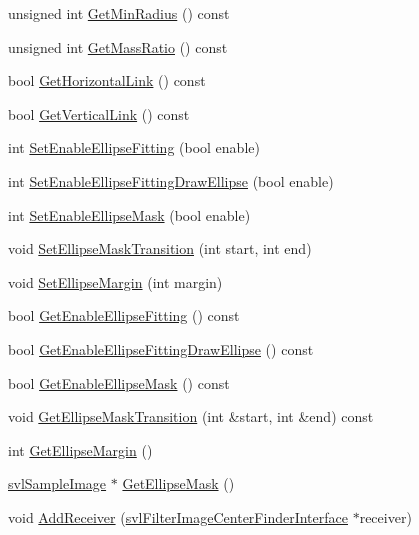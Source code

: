 \begin{DoxyCompactItemize}
\item 
unsigned int \hyperlink{classsvl_filter_image_center_finder_aee57a2627e70cf9d615f38cd833e5f8a}{Get\-Min\-Radius} () const 
\item 
unsigned int \hyperlink{classsvl_filter_image_center_finder_a0041521938da500f3e478083f447a709}{Get\-Mass\-Ratio} () const 
\item 
bool \hyperlink{classsvl_filter_image_center_finder_a0293e49d410ca18049ca7e7b09585229}{Get\-Horizontal\-Link} () const 
\item 
bool \hyperlink{classsvl_filter_image_center_finder_a395359676b6956f465dcf283d78e40ac}{Get\-Vertical\-Link} () const 
\item 
int \hyperlink{classsvl_filter_image_center_finder_a3fb0d14197e6e0e67918a075c17a0db3}{Set\-Enable\-Ellipse\-Fitting} (bool enable)
\item 
int \hyperlink{classsvl_filter_image_center_finder_a3c3ac4525b0adf2c9c9b74d80e0298a1}{Set\-Enable\-Ellipse\-Fitting\-Draw\-Ellipse} (bool enable)
\item 
int \hyperlink{classsvl_filter_image_center_finder_a3f9384ebde6adbddb079ef78519de0c5}{Set\-Enable\-Ellipse\-Mask} (bool enable)
\item 
void \hyperlink{classsvl_filter_image_center_finder_ae0183d7a26a709a6b082cd61b01794a1}{Set\-Ellipse\-Mask\-Transition} (int start, int end)
\item 
void \hyperlink{classsvl_filter_image_center_finder_a2876dab0dd034e15d830ffc5d48a44a3}{Set\-Ellipse\-Margin} (int margin)
\item 
bool \hyperlink{classsvl_filter_image_center_finder_a799c53cec676b9ca3160eb28bd1d3596}{Get\-Enable\-Ellipse\-Fitting} () const 
\item 
bool \hyperlink{classsvl_filter_image_center_finder_ad973c1a4515262bdf318e5c99d9404cf}{Get\-Enable\-Ellipse\-Fitting\-Draw\-Ellipse} () const 
\item 
bool \hyperlink{classsvl_filter_image_center_finder_af15908037b03b9b4fa2460942286f527}{Get\-Enable\-Ellipse\-Mask} () const 
\item 
void \hyperlink{classsvl_filter_image_center_finder_a614e6915f7414a9e40e4fa46fb3980c0}{Get\-Ellipse\-Mask\-Transition} (int \&start, int \&end) const 
\item 
int \hyperlink{classsvl_filter_image_center_finder_a3e6b3ab69cd202bdb0f67b3a944f4e1f}{Get\-Ellipse\-Margin} ()
\item 
\hyperlink{classsvl_sample_image}{svl\-Sample\-Image} $\ast$ \hyperlink{classsvl_filter_image_center_finder_a12e845a087b8a9ae26ecbe5054491514}{Get\-Ellipse\-Mask} ()
\item 
void \hyperlink{classsvl_filter_image_center_finder_a634d4134222a107752c50cac50a5a48b}{Add\-Receiver} (\hyperlink{classsvl_filter_image_center_finder_interface}{svl\-Filter\-Image\-Center\-Finder\-Interface} $\ast$receiver)
\end{DoxyCompactItemize}
